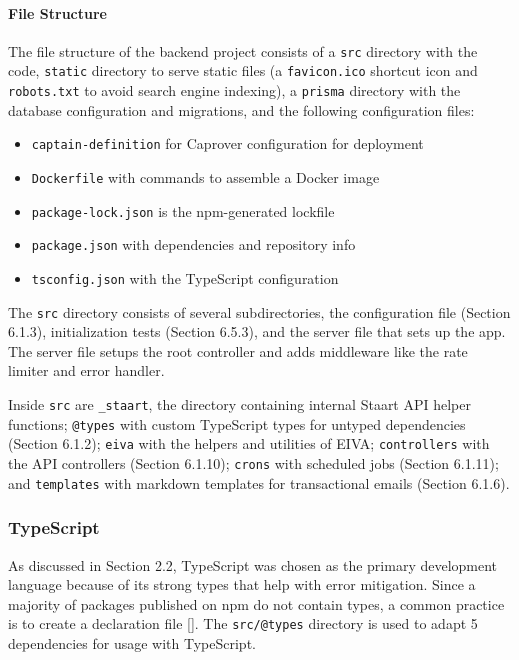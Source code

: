 \documentclass{article}
\begin{document}
\paragraph{File Structure}

The file structure of the backend project consists of a \texttt{src} directory with the code, \texttt{static} directory to serve static files (a \texttt{favicon.ico} shortcut icon and \texttt{robots.txt} to avoid search engine indexing), a \texttt{prisma} directory with the database configuration and migrations, and the following configuration files:

\begin{itemize}
	\item \texttt{captain-definition} for Caprover configuration for deployment
	\item \texttt{Dockerfile} with commands to assemble a Docker image
	\item \texttt{package-lock.json} is the npm-generated lockfile
	\item \texttt{package.json} with dependencies and repository info
	\item \texttt{tsconfig.json} with the TypeScript configuration
\end{itemize}

The \texttt{src} directory consists of several subdirectories, the configuration file (Section 6.1.3), initialization tests (Section 6.5.3), and the server file that sets up the app. The server file setups the root controller and adds middleware like the rate limiter and error handler.

Inside \texttt{src} are \texttt{\_staart}, the directory containing internal Staart API helper functions; \texttt{@types} with custom TypeScript types for untyped dependencies (Section 6.1.2); \texttt{eiva} with the helpers and utilities of EIVA; \texttt{controllers} with the API controllers (Section 6.1.10); \texttt{crons} with scheduled jobs (Section 6.1.11); and \texttt{templates} with markdown templates for transactional emails (Section 6.1.6).

\subsubsection{TypeScript}

As discussed in Section 2.2, TypeScript was chosen as the primary development language because of its strong types that help with error mitigation. Since a majority of packages published on npm do not contain types, a common practice is to create a declaration file []. The \texttt{src/@types} directory is used to adapt 5 dependencies for usage with TypeScript.
\end{document}
